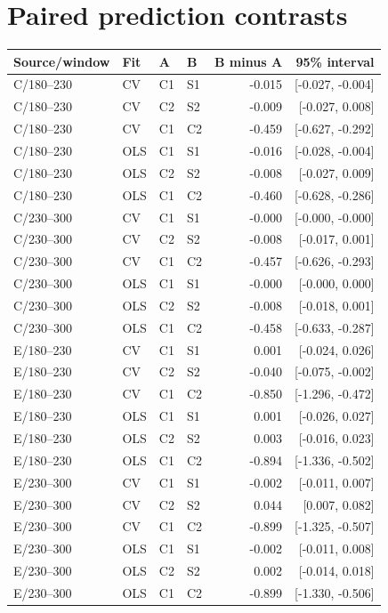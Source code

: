 \documentclass[11pt,a4paper]{article}
\begin{document}
\section{Paired prediction contrasts}
\small\begin{longtable}{llllrr}\toprule
Source/window & Fit & A & B & B minus A & 95\% interval\\\midrule\endhead
C/180--230 & CV & C1 & S1 & -0.015 & [-0.027, -0.004]\\
C/180--230 & CV & C2 & S2 & -0.009 & [-0.027, 0.008]\\
C/180--230 & CV & C1 & C2 & -0.459 & [-0.627, -0.292]\\
C/180--230 & OLS & C1 & S1 & -0.016 & [-0.028, -0.004]\\
C/180--230 & OLS & C2 & S2 & -0.008 & [-0.027, 0.009]\\
C/180--230 & OLS & C1 & C2 & -0.460 & [-0.628, -0.286]\\
C/230--300 & CV & C1 & S1 & -0.000 & [-0.000, -0.000]\\
C/230--300 & CV & C2 & S2 & -0.008 & [-0.017, 0.001]\\
C/230--300 & CV & C1 & C2 & -0.457 & [-0.626, -0.293]\\
C/230--300 & OLS & C1 & S1 & -0.000 & [-0.000, 0.000]\\
C/230--300 & OLS & C2 & S2 & -0.008 & [-0.018, 0.001]\\
C/230--300 & OLS & C1 & C2 & -0.458 & [-0.633, -0.287]\\
E/180--230 & CV & C1 & S1 & 0.001 & [-0.024, 0.026]\\
E/180--230 & CV & C2 & S2 & -0.040 & [-0.075, -0.002]\\
E/180--230 & CV & C1 & C2 & -0.850 & [-1.296, -0.472]\\
E/180--230 & OLS & C1 & S1 & 0.001 & [-0.026, 0.027]\\
E/180--230 & OLS & C2 & S2 & 0.003 & [-0.016, 0.023]\\
E/180--230 & OLS & C1 & C2 & -0.894 & [-1.336, -0.502]\\
E/230--300 & CV & C1 & S1 & -0.002 & [-0.011, 0.007]\\
E/230--300 & CV & C2 & S2 & 0.044 & [0.007, 0.082]\\
E/230--300 & CV & C1 & C2 & -0.899 & [-1.325, -0.507]\\
E/230--300 & OLS & C1 & S1 & -0.002 & [-0.011, 0.008]\\
E/230--300 & OLS & C2 & S2 & 0.002 & [-0.014, 0.018]\\
E/230--300 & OLS & C1 & C2 & -0.899 & [-1.330, -0.506]\\
\bottomrule\end{longtable}\normalsize
\end{document}
